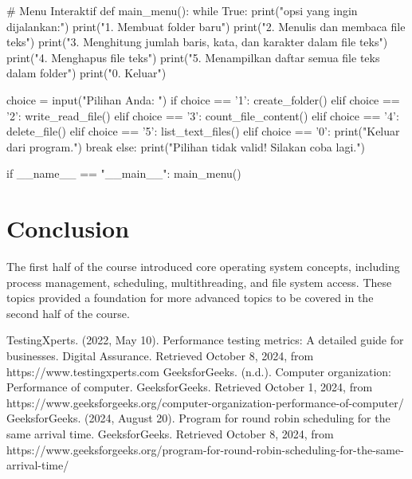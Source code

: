 \documentclass[12pt]{article}
\begin{document}
\begin{python}
# Menu Interaktif
def main_menu():
    while True:
        print("\nPilih opsi yang ingin dijalankan:")
        print("1. Membuat folder baru")
        print("2. Menulis dan membaca file teks")
        print("3. Menghitung jumlah baris, kata, dan karakter dalam file teks")
        print("4. Menghapus file teks")
        print("5. Menampilkan daftar semua file teks dalam folder")
        print("0. Keluar")
        
        choice = input("Pilihan Anda: ")
        if choice == '1':
            create_folder()
        elif choice == '2':
            write_read_file()
        elif choice == '3':
            count_file_content()
        elif choice == '4':
            delete_file()
        elif choice == '5':
            list_text_files()
        elif choice == '0':
            print("Keluar dari program.")
            break
        else:
            print("Pilihan tidak valid! Silakan coba lagi.")

if __name__ == "__main__":
    main_menu()

\end{python}


\section{Conclusion}
The first half of the course introduced core operating system concepts, including process management, scheduling, multithreading, and file system access. These topics provided a foundation for more advanced topics to be covered in the second half of the course.

\begin{thebibliography}{9}
    TestingXperts. (2022, May 10). Performance testing metrics: A detailed guide for businesses. Digital Assurance. Retrieved October 8, 2024, from https://www.testingxperts.com
    GeeksforGeeks. (n.d.). Computer organization: Performance of computer. GeeksforGeeks. Retrieved October 1, 2024, from https://www.geeksforgeeks.org/computer-organization-performance-of-computer/
    GeeksforGeeks. (2024, August 20). Program for round robin scheduling for the same arrival time. GeeksforGeeks. Retrieved October 8, 2024, from https://www.geeksforgeeks.org/program-for-round-robin-scheduling-for-the-same-arrival-time/
\end{thebibliography}
\end{document}
